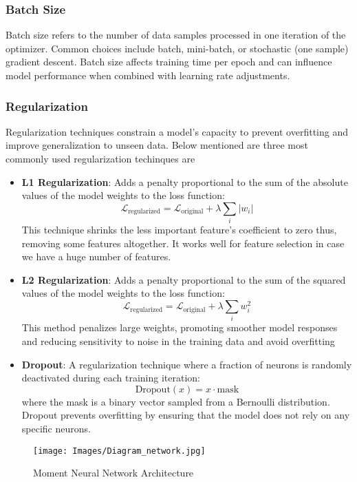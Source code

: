 \subsubsection{Batch Size}

Batch size refers to the number of data samples processed in one iteration of the optimizer. Common choices include batch, mini-batch, or stochastic (one sample) gradient descent. Batch size affects training time per epoch and can influence model performance when combined with learning rate adjustments.


\subsubsection{Regularization}
Regularization techniques constrain a model's capacity to prevent overfitting and improve generalization to unseen data. Below mentioned are three most commonly used regularization techinques are

\begin{itemize}
    \item \textbf{L1 Regularization}: Adds a penalty proportional to the sum of the absolute values of the model weights to the loss function:
    \[ \mathcal{L}_{\text{regularized}} = \mathcal{L}_{\text{original}} + \lambda \sum_{i} |w_i| \]
    This technique shrinks the less important feature’s coefficient to zero thus, removing some features altogether. It works well for feature selection in case we have a huge number of features.

    \item \textbf{L2 Regularization}: Adds a penalty proportional to the sum of the squared values of the model weights to the loss function:
    \[ \mathcal{L}_{\text{regularized}} = \mathcal{L}_{\text{original}} + \lambda \sum_{i} w_i^2 \]
    This method penalizes large weights, promoting smoother model responses and reducing sensitivity to noise in the training data and avoid overfitting

    \item \textbf{Dropout}: A regularization technique where a fraction of neurons is randomly deactivated during each training iteration:
    \[ \text{Dropout}(x) = x \cdot \text{mask} \]
    where the mask is a binary vector sampled from a Bernoulli distribution. Dropout prevents overfitting by ensuring that the model does not rely on any specific neurons.
\end{itemize}

 \begin{figure}[ht]
    \centering
    \texttt{[image: Images/Diagram\_network.jpg]}
    \caption{Moment Neural Network Architecture}
    \label{fig:5.1} 
\end{figure}

